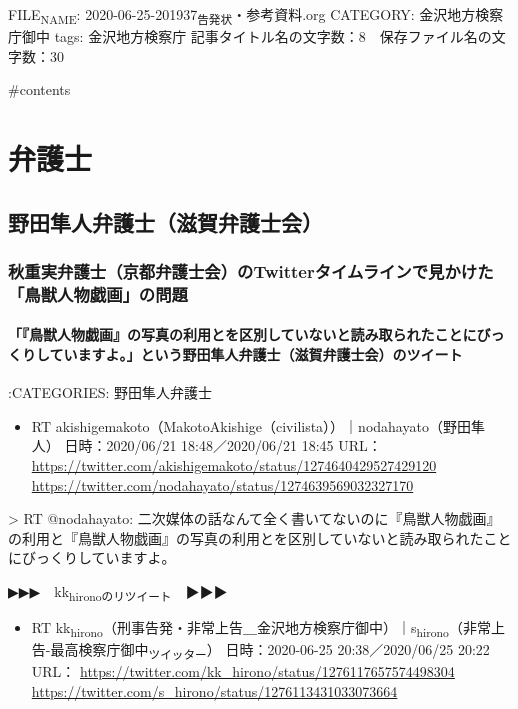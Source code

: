 \documentclass[]{ltjarticle}
\let\oldparagraph\paragraph
\renewcommand{\paragraph}[1]{\oldparagraph{#1}\mbox{}}
\begin{document}
FILE\textsubscript{NAME}: 2020-06-25-201937\textsubscript{告発状}・参考資料.org
CATEGORY: 金沢地方検察庁御中
tags:  金沢地方検察庁
記事タイトル名の文字数：8　保存ファイル名の文字数：30

\#contents

\section{弁護士}
\label{sec:orgfbf2b1a}

\subsection{野田隼人弁護士（滋賀弁護士会）}
\label{sec:org347691a}

\subsubsection{秋重実弁護士（京都弁護士会）のTwitterタイムラインで見かけた「鳥獣人物戯画」の問題}
\label{sec:org5a4b162}

\paragraph{「『鳥獣人物戯画』の写真の利用とを区別していないと読み取られたことにびっくりしていますよ。」という野田隼人弁護士（滋賀弁護士会）のツイート}
\label{sec:org87e1db5}

:CATEGORIES: 野田隼人弁護士

\begin{itemize}
\item RT akishigemakoto（MakotoAkishige（civilista））｜nodahayato（野田隼人） 日時：2020/06/21 18:48／2020/06/21 18:45 URL： \url{https://twitter.com/akishigemakoto/status/1274640429527429120} \url{https://twitter.com/nodahayato/status/1274639569032327170}
\end{itemize}

> RT @nodahayato: 二次媒体の話なんて全く書いてないのに『鳥獣人物戯画』の利用と『鳥獣人物戯画』の写真の利用とを区別していないと読み取られたことにびっくりしていますよ。  

▶▶▶　kk\textsubscript{hironoのリツイート}　▶▶▶  

\begin{itemize}
\item RT kk\textsubscript{hirono}（刑事告発・非常上告＿金沢地方検察庁御中）｜s\textsubscript{hirono}（非常上告-最高検察庁御中\textsubscript{ツイッター}） 日時：2020-06-25 20:38／2020/06/25 20:22 URL： \url{https://twitter.com/kk\_hirono/status/1276117657574498304} \url{https://twitter.com/s\_hirono/status/1276113431033073664}
\end{itemize}
\end{document}
